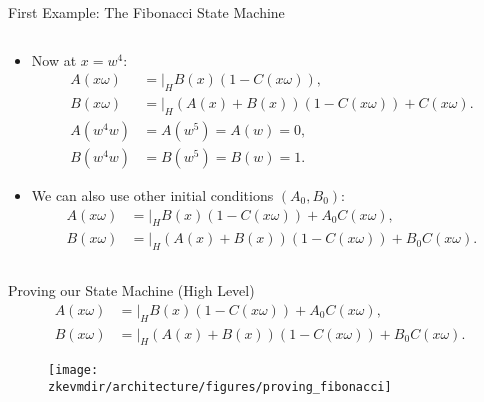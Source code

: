 \begin{frame}[allowframebreaks]{First Example: The Fibonacci State Machine}
\begin{columns}
\begin{column}{0.6\textwidth}
\begin{itemize}
\item Now at $x = w^4$:
\begin{align*}
A(x\omega) &= \bigg\lvert_H  B(x)(1 - C(x\omega)), \\
B(x\omega) &= \bigg\lvert_H (A(x) + B(x))(1 - C(x\omega)) + C(x\omega).\\
A(w^4 w) &= A(w^5) = A(w) = 0, \\
B(w^4 w) &= B(w^5) = B(w) = 1.
\end{align*}
\item We can also use other initial conditions $(A_0, B_0)$:
\begin{align*}
A(x\omega) &= \bigg\lvert_H  B(x)(1 - C(x\omega))+ A_0C(x\omega), \\
B(x\omega) &= \bigg\lvert_H  (A(x) + B(x))(1 - C(x\omega)) + B_0 C(x\omega).
\end{align*}
\end{itemize}
\end{column}
\end{columns}
\end{frame}




\begin{frame}{Proving our State Machine (High Level)}
\begin{align*}
A(x\omega) &= \bigg\lvert_H  B(x)(1 - C(x\omega))+ A_0C(x\omega), \\
B(x\omega) &= \bigg\lvert_H  (A(x) + B(x))(1 - C(x\omega)) + B_0 C(x\omega).
\end{align*}

\begin{figure}
\texttt{[image: \\zkevmdir/architecture/figures/proving\_fibonacci]}
\end{figure}
\end{frame}





